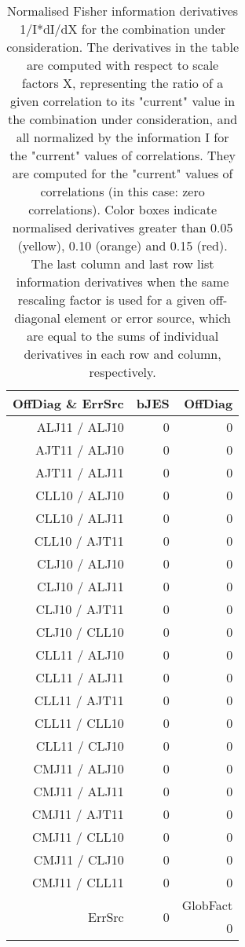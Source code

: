 \begin{table}[H]
\scriptsize
\begin{center}
\renewcommand{\arraystretch}{1.1}
\begin{tabular}{|r|r|r|}
\hline
 OffDiag \& ErrSrc & {\tiny bJES} & OffDiag\\
\hline
ALJ11 / ALJ10 &  0 &  0 \\
AJT11 / ALJ10 &  0 &  0 \\
AJT11 / ALJ11 &  0 &  0 \\
CLL10 / ALJ10 &  0 &  0 \\
CLL10 / ALJ11 &  0 &  0 \\
CLL10 / AJT11 &  0 &  0 \\
CLJ10 / ALJ10 &  0 &  0 \\
CLJ10 / ALJ11 &  0 &  0 \\
CLJ10 / AJT11 &  0 &  0 \\
CLJ10 / CLL10 &  0 &  0 \\
CLL11 / ALJ10 &  0 &  0 \\
CLL11 / ALJ11 &  0 &  0 \\
CLL11 / AJT11 &  0 &  0 \\
CLL11 / CLL10 &  0 &  0 \\
CLL11 / CLJ10 &  0 &  0 \\
CMJ11 / ALJ10 &  0 &  0 \\
CMJ11 / ALJ11 &  0 &  0 \\
CMJ11 / AJT11 &  0 &  0 \\
CMJ11 / CLL10 &  0 &  0 \\
CMJ11 / CLJ10 &  0 &  0 \\
CMJ11 / CLL11 &  0 &  0 \\
\hline
\multirow{2}{*}{ErrSrc} & \multirow{2}{*}{ 0} & GlobFact\\
 & &  0 \\
\hline
\end{tabular}
\renewcommand{\arraystretch}{1}
\caption{Normalised Fisher information derivatives 1/I*dI/dX for the combination under consideration. The derivatives in the table are computed with respect to scale factors X, representing the ratio of a given correlation to its "current" value in the combination under consideration, and all normalized by the information I for the "current" values of correlations. They are computed for the "current" values of correlations (in this case: zero correlations). Color boxes indicate normalised derivatives greater than 0.05 (yellow), 0.10 (orange) and 0.15 (red). The last column and last row list information derivatives when the same rescaling factor is used for a given off-diagonal element or error source, which are equal to the sums of individual derivatives in each row and column, respectively.}
\end{center}
\end{table}
